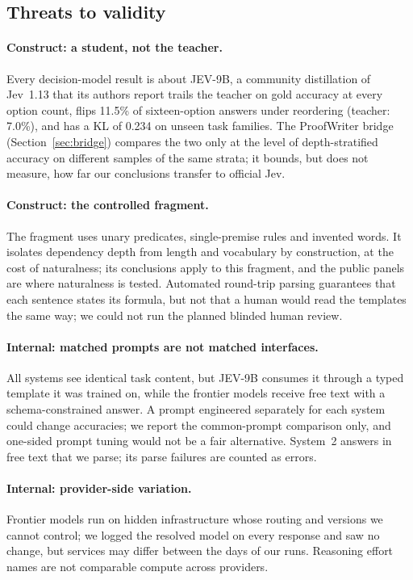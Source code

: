 \subsection{Threats to validity}
\label{sec:threats}

\paragraph{Construct: a student, not the teacher.}
Every decision-model result is about JEV-9B, a community distillation of Jev~1.13 that its authors report trails the teacher on gold accuracy at every option count, flips 11.5\% of sixteen-option answers under reordering (teacher: 7.0\%), and has a KL of 0.234 on unseen task families.
The ProofWriter bridge (Section~\ref{sec:bridge}) compares the two only at the level of depth-stratified accuracy on different samples of the same strata; it bounds, but does not measure, how far our conclusions transfer to official Jev.

\paragraph{Construct: the controlled fragment.}
The fragment uses unary predicates, single-premise rules and invented words.
It isolates dependency depth from length and vocabulary by construction, at the cost of naturalness; its conclusions apply to this fragment, and the public panels are where naturalness is tested.
Automated round-trip parsing guarantees that each sentence states its formula, but not that a human would read the templates the same way; we could not run the planned blinded human review.

\paragraph{Internal: matched prompts are not matched interfaces.}
All systems see identical task content, but JEV-9B consumes it through a typed template it was trained on, while the frontier models receive free text with a schema-constrained answer.
A prompt engineered separately for each system could change accuracies; we report the common-prompt comparison only, and one-sided prompt tuning would not be a fair alternative.
System~2 answers in free text that we parse; its parse failures are counted as errors.

\paragraph{Internal: provider-side variation.}
Frontier models run on hidden infrastructure whose routing and versions we cannot control; we logged the resolved model on every response and saw no change, but services may differ between the days of our runs.
Reasoning effort names are not comparable compute across providers.

